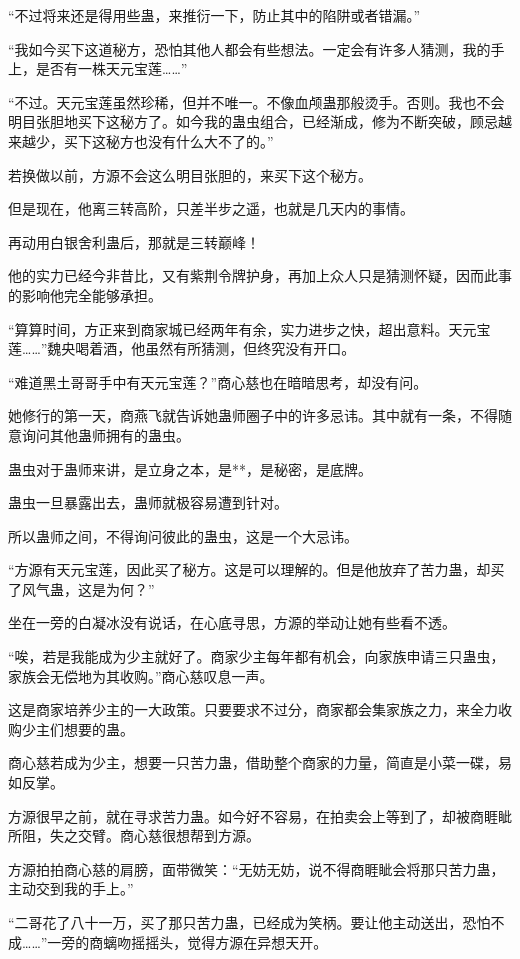 \begin{this_body}
“不过将来还是得用些蛊，来推衍一下，防止其中的陷阱或者错漏。”

“我如今买下这道秘方，恐怕其他人都会有些想法。一定会有许多人猜测，我的手上，是否有一株天元宝莲……”

“不过。天元宝莲虽然珍稀，但并不唯一。不像血颅蛊那般烫手。否则。我也不会明目张胆地买下这秘方了。如今我的蛊虫组合，已经渐成，修为不断突破，顾忌越来越少，买下这秘方也没有什么大不了的。”

若换做以前，方源不会这么明目张胆的，来买下这个秘方。

但是现在，他离三转高阶，只差半步之遥，也就是几天内的事情。

再动用白银舍利蛊后，那就是三转巅峰！

他的实力已经今非昔比，又有紫荆令牌护身，再加上众人只是猜测怀疑，因而此事的影响他完全能够承担。

“算算时间，方正来到商家城已经两年有余，实力进步之快，超出意料。天元宝莲……”魏央喝着酒，他虽然有所猜测，但终究没有开口。

“难道黑土哥哥手中有天元宝莲？”商心慈也在暗暗思考，却没有问。

她修行的第一天，商燕飞就告诉她蛊师圈子中的许多忌讳。其中就有一条，不得随意询问其他蛊师拥有的蛊虫。

蛊虫对于蛊师来讲，是立身之本，是**，是秘密，是底牌。

蛊虫一旦暴露出去，蛊师就极容易遭到针对。

所以蛊师之间，不得询问彼此的蛊虫，这是一个大忌讳。

“方源有天元宝莲，因此买了秘方。这是可以理解的。但是他放弃了苦力蛊，却买了风气蛊，这是为何？”

坐在一旁的白凝冰没有说话，在心底寻思，方源的举动让她有些看不透。

“唉，若是我能成为少主就好了。商家少主每年都有机会，向家族申请三只蛊虫，家族会无偿地为其收购。”商心慈叹息一声。

这是商家培养少主的一大政策。只要要求不过分，商家都会集家族之力，来全力收购少主们想要的蛊。

商心慈若成为少主，想要一只苦力蛊，借助整个商家的力量，简直是小菜一碟，易如反掌。

方源很早之前，就在寻求苦力蛊。如今好不容易，在拍卖会上等到了，却被商睚眦所阻，失之交臂。商心慈很想帮到方源。

方源拍拍商心慈的肩膀，面带微笑：“无妨无妨，说不得商睚眦会将那只苦力蛊，主动交到我的手上。”

“二哥花了八十一万，买了那只苦力蛊，已经成为笑柄。要让他主动送出，恐怕不成……”一旁的商螭吻摇摇头，觉得方源在异想天开。


\end{this_body}
